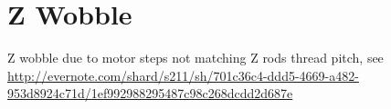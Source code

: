 
\section{Z Wobble} %
\label{sec:z_wobble}


Z wobble due to motor steps not matching Z rods thread pitch, see \url{http://evernote.com/shard/s211/sh/701c36c4-ddd5-4669-a482-953d8924c71d/1ef992988295487c98c268dcdd2d687e}


